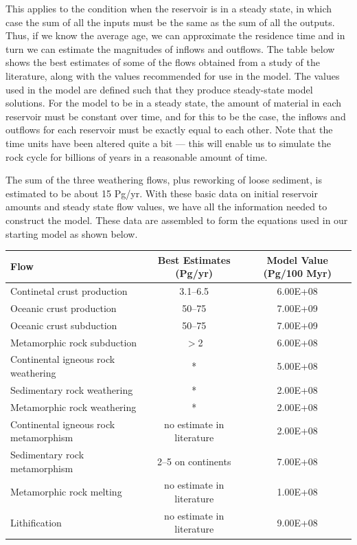 \documentclass[11pt,letterpaper]{article}
\begin{document}
This applies to the condition when the reservoir is in a steady state, in which case the sum of all the inputs must be the same as the sum of all the outputs. Thus, if we know the average age, we can approximate the residence time and in turn we can estimate the magnitudes of inflows and outflows. The table below shows the best estimates of some of the flows obtained from a study of the literature, along with the values recommended for use in the model. The values used in the model are defined such that they produce steady-state model solutions. For the model to be in a steady state, the amount of material in each reservoir must be constant over time, and for this to be the case, the inflows and outflows for each reservoir must be exactly equal to each other. Note that the time units have been altered quite a bit --- this will enable us to simulate the rock cycle for billions of years in a reasonable amount of time.

The sum of the three weathering flows, plus reworking of loose sediment, is estimated to be about 15 Pg/yr. With these basic data on initial reservoir amounts and steady state flow values, we
have all the information needed to construct the model. These data are assembled to
form the equations used in our starting model as shown below.

\begin{table}[h]
\begin{tabular}{lcc}
Flow & \hspace{5pt} Best Estimates (Pg/yr) \hspace{5pt}& \hspace{5pt} Model Value (Pg/100 Myr) \hspace{5pt}\\
\hline
Continetal crust production & 3.1--6.5 & 6.00E+08\\
Oceanic crust production & 50--75 & 7.00E+09\\
Oceanic crust subduction & 50--75 & 7.00E+09\\
Metamorphic rock subduction & $>$2 & 6.00E+08\\
Continental igneous rock weathering & * & 5.00E+08\\
Sedimentary rock weathering & * & 2.00E+08\\
Metamorphic rock weathering & * & 2.00E+08\\
Continental igneous rock metamorphism & no estimate in literature & 2.00E+08\\
Sedimentary rock metamorphism & 2--5 on continents & 7.00E+08\\
Metamorphic rock melting & no estimate in literature & 1.00E+08\\
Lithification & no estimate in literature & 9.00E+08\\
\hline 
\end{tabular}
\end{table}
\end{document}
